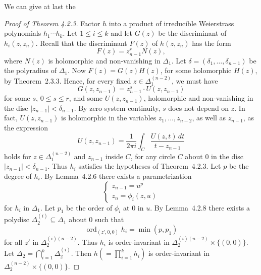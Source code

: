 \documentclass[11pt]{article}
\theoremstyle{plain}
\theoremstyle{definition}
\DeclareMathOperator{\ord}{ord}
\begin{document}
We can give at last the

\begin{proof}[Proof of Theorem 4.2.3]
Factor $h$ into a product of irreducible Weierstrass polynomials
$h_1 \cdots h_k$. Let $1 \le i \le k$ and let $G(z)$ be the
discriminant of $h_i(z, z_n)$. Recall that the discriminant $F(z)$
of $h(z, z_n)$ has the form
\[
F(z) = z_{n-1}^r N(z),
\]
where $N(z)$ is holomorphic and non-vanishing in $\Delta_1$. Let
$\delta = (\delta_1, \ldots, \delta_{n-1})$ be the polyradius of
$\Delta_1$. Now $F(z) = G(z) H(z)$, for some holomorphic $H(z)$, by
Theorem~2.3.3. Hence, for every fixed $z \in \Delta_1^{(n-2)}$, we
must have
\[
G(z, z_{n-1}) = z_{n-1}^s \cdot U(z, z_{n-1})
\]
for some $s$, $0 \le s \le r$, and some $U(z, z_{n-1})$, holomorphic
and non-vanishing in the disc $|z_{n-1}| < \delta_{n-1}$. By zero
system continuity, $s$ does not depend on $z$. In fact,
$U(z, z_{n-1})$ is holomorphic in the variables
$z_1, \ldots, z_{n-2}$, as well as $z_{n-1}$, as the expression
\[
U(z, z_{n-1}) = \frac{1}{2 \pi i} \int_C \frac{U(z, t) \, dt}
{t - z_{n-1}}
\]
holds for $z \in \Delta_1^{(n-2)}$ and $z_{n-1}$ inside $C$, for any
circle $C$ about $0$ in the disc $|z_{n-1}| < \delta_{n-1}$. Thus
$h_i$ satisfies the hypotheses of Theorem~4.2.3. Let $p$ be the
degree of $h_i$. By Lemma~4.2.6 there exists a parametrization
\[
\begin{cases}
z_{n-1} = u^p \\
z_n = \phi_i(z, u)
\end{cases}
\]
for $h_i$ in $\Delta_1$. Let $p_1$ be the order of $\phi_i$ at $0$
in $u$. By Lemma~4.2.8 there exists a polydisc
$\Delta_2^{(i)} \subseteq \Delta_1$ about $0$ such that
\[
\ord_{(z', 0, 0)} h_i = \min(p, p_1)
\]
for all $z'$ in $\Delta_2^{(i)(n-2)}$. Thus $h_i$ is order-invariant
in $\Delta_2^{(i)(n-2)} \times \{ (0, 0) \}$. Let
$\Delta_2 = \bigcap_{i=1}^{k} \Delta_2^{(i)}$. Then
$h \left( = \prod_{i=1}^{k} h_i \right)$ is order-invariant in
$\Delta_2^{(n-2)} \times \{ (0, 0) \}$.
\end{proof}
\end{document}
